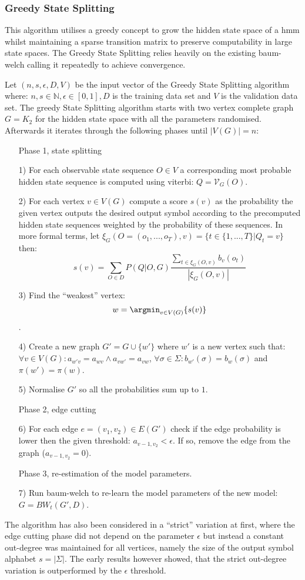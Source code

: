 \subsubsection{Greedy State Splitting}

This algorithm utilises a greedy concept to grow the hidden state space of a \gls{hmm} whilst maintaining a sparse transition matrix to preserve computability in large state spaces. The Greedy State Splitting relies heavily on the existing \gls{baum-welch} calling it repeatedly to achieve convergence.

Let $(n, s, \epsilon, D, V)$ be the input vector of the Greedy State Splitting algorithm where: $n, s \in \mathbb{N}, \epsilon\in[0,1], D$ is the training data set and $V$ is the validation data set. The greedy State Splitting algorithm starts with two vertex complete graph $G=K_2$ for the hidden state space with all the parameters randomised. Afterwards it iterates through the following phases until $|V(G)| = n$:

\begin{itemize}
	\item[] Phase 1, state splitting
	\item[1)] For each observable state sequence $O \in V$ a corresponding most probable hidden state sequence is computed using \gls{viterbi}: $Q=\mathcal{V}_G(O)$.
	\item[2)] For each vertex $v \in V(G)$ compute a score $s(v)$ as the probability the given vertex outputs the desired output symbol according to the precomputed hidden state sequences weighted by the probability of these sequences. In more formal terms, let $\xi_G(O=(o_1,...,o_T), v) = \{t\in\{1, ..., T\}|Q_t=v\}$ then: $$s(v) = \sum_{O\in D}P(Q|O,G) \frac{\sum_{t \in \xi_G(O, v)}b_v(o_t)}{|\xi_G(O, v)|}$$
	\item[3)] Find the ``weakest'' vertex: $$w = \argmin_{v\in V(G)}\{s(v)\}$$.
	\item[4)] Create a new graph $G' = G\cup \{w'\}$ where $w'$ is a new vertex such that: $\forall v\in V(G): a_{w'v} = a_{wv} \land a_{vw'} = a_{vw}$, $\forall \sigma \in \Sigma: b_{w'}(\sigma) = b_w(\sigma)$ and $\pi(w') = \pi(w)$.
	\item[5)] Normalise $G'$ so all the probabilities sum up to $1$.
	\item[] Phase 2, edge cutting
	\item[6)] For each edge $e = (v_1,v_2)\in E(G')$ check if the edge probability is lower then the given threshold: $a_{v-1,v_2}<\epsilon$. If so, remove the edge from the graph ($a_{v-1,v_2} = 0$).
	\item[] Phase 3, re-estimation of the model parameters.
	\item[7)] Run \gls{baum-welch} to re-learn the model parameters of the new model: $G = BW_t(G', D)$.
\end{itemize}

The algorithm has also been considered in a ``strict'' variation at first, where the edge cutting phase did not depend on the parameter $\epsilon$ but instead a constant out-degree was maintained for all vertices, namely the size of the output symbol alphabet $s = |\Sigma|$. The early results however showed, that the strict out-degree variation is outperformed by the $\epsilon$ threshold.